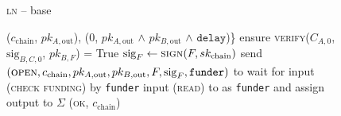 \begin{figure}[H]
\begin{processbox}{\textsc{ln} -- base}
\begin{algorithmic}[1]
{          ($c_{\mathrm{chain}}$, $pk_{A, \mathrm{out}}$), ($0$, $pk_{A,
          \mathrm{out}}$ $\wedge$ $pk_{B, \mathrm{out}}$ $\wedge$
          $\texttt{delay}$)\}}
          \State {}
          \State {}
          \State {}
          \State {}
          \State ensure \textsc{verify}($C_{A, 0}$, $\mathrm{sig}_{B, C, 0}$,
          $pk_{B, F}$) = True
        \EndIf
        \State $\mathrm{sig}_F \gets \textsc{sign}(F, sk_{\mathrm{chain}})$
        \State send $(\textsc{open}, c_{\mathrm{chain}}, pk_{A, \mathrm{out}},
        pk_{B, \mathrm{out}}, F, \mathrm{sig}_F, \texttt{funder})$ to \adversary
          \State wait for input (\textsc{check funding}) by \texttt{funder}
          \State input (\textsc{read}) to \ledger as \texttt{funder} and assign
          output to $\Sigma$
        \EndWhile
        \State \Return (\textsc{ok}, $c_{\mathrm{chain}}$)
      \EndIndent
    \end{algorithmic}
  \end{processbox}
  \caption{}
  \label{code:ln:base}
\end{figure}

